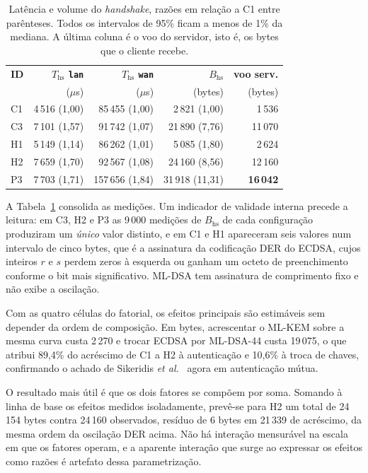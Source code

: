 \documentclass[conference]{IEEEtran}
\begin{document}
\begin{table}[!t]
\caption{Latência e volume do \textit{handshake}, razões em relação a C1 entre
parênteses. Todos os intervalos de 95\% ficam a menos de 1\% da mediana. A última
coluna é o voo do servidor, isto é, os bytes que o cliente recebe.}
\label{tab:resultados}
\centering
\footnotesize
\setlength{\tabcolsep}{3.5pt}
\begin{tabular}{@{}lrrrr@{}}
\toprule
\textbf{ID} &
\textbf{$T_{\mathrm{hs}}$ \texttt{lan}} &
\textbf{$T_{\mathrm{hs}}$ \texttt{wan}} &
\textbf{$B_{\mathrm{hs}}$} &
\textbf{voo serv.} \\
 & ($\mu$s) & ($\mu$s) & (bytes) & (bytes) \\
\midrule
C1 & 4\,516 (1{,}00) & 85\,455 (1{,}00) & 2\,821 (1{,}00)  & 1\,536 \\
C3 & 7\,101 (1{,}57) & 91\,742 (1{,}07) & 21\,890 (7{,}76) & 11\,070 \\
H1 & 5\,149 (1{,}14) & 86\,262 (1{,}01) & 5\,085 (1{,}80)  & 2\,624 \\
H2 & 7\,659 (1{,}70) & 92\,567 (1{,}08) & 24\,160 (8{,}56) & 12\,160 \\
\midrule
P3 & 7\,703 (1{,}71) & 157\,656 (1{,}84) & 31\,918 (11{,}31) & \textbf{16\,042} \\
\bottomrule
\end{tabular}
\end{table}

A Tabela~\ref{tab:resultados} consolida as medições. Um indicador de validade
interna precede a leitura: em C3, H2 e P3 as 9\,000 medições de $B_{\mathrm{hs}}$
de cada configuração produziram um \emph{único} valor distinto, e em C1 e H1
apareceram seis valores num intervalo de cinco bytes, que é a assinatura da
codificação DER do ECDSA, cujos inteiros $r$ e $s$ perdem zeros à esquerda ou
ganham um octeto de preenchimento conforme o bit mais significativo. ML-DSA tem
assinatura de comprimento fixo e não exibe a oscilação.

Com as quatro células do fatorial, os efeitos principais são estimáveis sem
depender da ordem de composição. Em bytes, acrescentar o ML-KEM sobre a mesma
curva custa 2\,270 e trocar ECDSA por ML-DSA-44 custa 19\,075, o que atribui
89,4\% do acréscimo de C1 a H2 à autenticação e 10,6\% à troca de chaves,
confirmando o achado de Sikeridis \textit{et al.}~\cite{sikeridis2020postquantum}
agora em autenticação mútua.

O resultado mais útil é que os dois fatores se compõem por soma. Somando à linha
de base os efeitos medidos isoladamente, prevê-se para H2 um total de 24\,154
bytes contra 24\,160 observados, resíduo de 6 bytes em 21\,339 de acréscimo, da
mesma ordem da oscilação DER acima. Não há interação mensurável na escala em que
os fatores operam, e a aparente interação que surge ao expressar os efeitos como
razões é artefato dessa parametrização.
\end{document}

